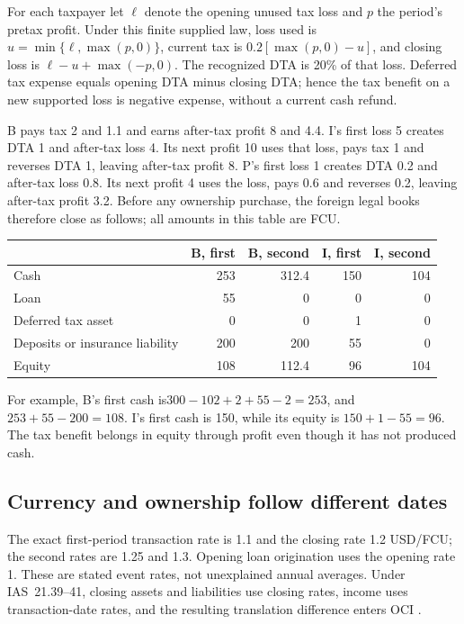 For each taxpayer let \(\ell\) denote the opening unused tax loss and \(p\)
the period's pretax profit. Under this finite supplied law, loss used is
\(u=\min\{\ell,\max(p,0)\}\), current tax is
\(0.2[\max(p,0)-u]\), and closing loss is
\(\ell-u+\max(-p,0)\). The recognized DTA is 20\% of that loss. Deferred
tax expense equals opening DTA minus closing DTA; hence the tax benefit on a
new supported loss is negative expense, without a current cash refund.

B pays tax 2 and 1.1 and earns after-tax profit 8 and 4.4. I's first loss 5 creates
DTA 1 and after-tax loss 4. Its next profit 10 uses that loss, pays tax 1 and
reverses DTA 1, leaving after-tax profit 8. P's first loss 1 creates DTA 0.2 and
after-tax loss 0.8. Its next profit 4 uses the loss, pays 0.6 and reverses 0.2,
leaving after-tax profit 3.2. Before any ownership purchase, the foreign legal
books therefore close as follows; all amounts in this table are FCU.

\begin{center}
\begin{tabular}{lrrrr}
\toprule & B, first & B, second & I, first & I, second\\\midrule
Cash &253&312.4&150&104\\
Loan &55&0&0&0\\
Deferred tax asset &0&0&1&0\\
Deposits or insurance liability &200&200&55&0\\
Equity &108&112.4&96&104\\\bottomrule
\end{tabular}
\end{center}
For example, B's first cash is\(300-102+2+55-2=253\), and
\(253+55-200=108\). I's first cash is 150, while its equity is
\(150+1-55=96\). The tax benefit belongs in equity through profit even
though it has not produced cash.

\subsection{Currency and ownership follow different dates}

The exact first-period transaction rate is 1.1 and the closing rate 1.2 USD/FCU;
the second rates are 1.25 and 1.3. Opening loan origination uses the opening
rate 1. These are stated event rates, not unexplained annual averages. Under
IAS~21.39--41, closing assets and liabilities use closing rates, income uses
transaction-date rates, and the resulting translation difference enters OCI
\citep{eu20231803}.

